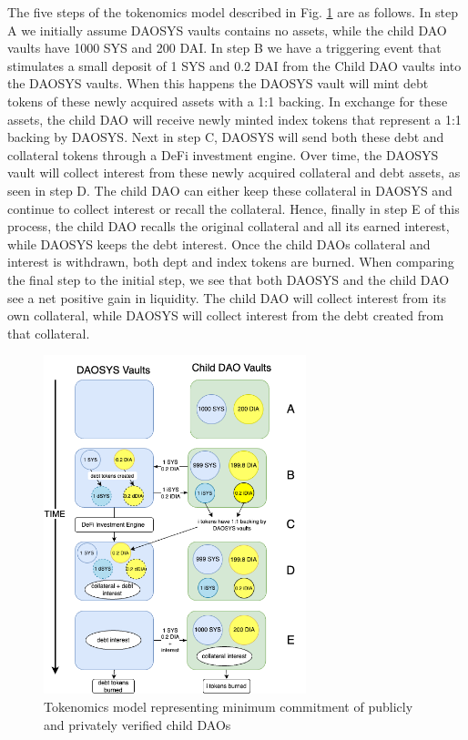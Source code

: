 \documentclass[journal,twocolumn,12pt]{ieeesyscoin}
\begin{document}
The five steps of the tokenomics model described in Fig. \ref{fig:tokenomics_model} are as follows. In step A we initially assume DAOSYS vaults contains no assets, while the child DAO vaults have 1000 SYS and 200 DAI. In step B we have a triggering event that stimulates a small deposit of 1 SYS and 0.2 DAI from the Child DAO vaults into the DAOSYS vaults. When this happens the DAOSYS vault will mint debt tokens of these newly acquired assets with a 1:1 backing. In exchange for these assets, the child DAO will receive newly minted index tokens that represent a 1:1 backing by DAOSYS. Next in step C, DAOSYS will send both these debt and collateral tokens through a DeFi investment engine. Over time, the DAOSYS vault will collect interest from these newly acquired collateral and debt assets, as seen in step D. The child DAO can either keep these collateral in DAOSYS and continue to collect interest or recall the collateral. Hence, finally in step E of this process, the child DAO recalls the original collateral and all its earned interest, while DAOSYS keeps the debt interest. Once the child DAOs collateral and interest is withdrawn, both dept and index tokens are burned. When comparing the final step to the initial step, we see that both DAOSYS and the child DAO see a net positive gain in liquidity. The child DAO will collect interest from its own collateral, while DAOSYS will collect interest from the debt created from that collateral. 

\begin{figure}[h!]
\includegraphics[width=3in]{img/tokenomics_model.png}
\caption{Tokenomics model representing minimum commitment of publicly and privately verified child DAOs} 
\label{fig:tokenomics_model}
\end{figure} 
\end{document}
